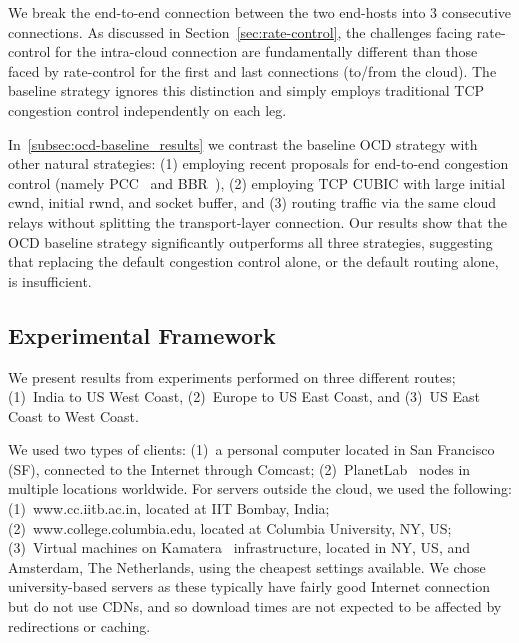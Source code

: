 \documentclass[newfonts=false,format=sigconf,10pt,letterpaper]{acmart}
\begin{document}
\vspace{0.1in} We break the end-to-end connection between the two end-hosts into $3$ consecutive connections. As discussed in Section~\ref{sec:rate-control}, the challenges facing rate-control for the intra-cloud connection are fundamentally different than those faced by rate-control for the first and last connections (to/from the cloud). The baseline strategy ignores this distinction and simply employs traditional TCP congestion control independently on each leg.

\vspace{0.1in}\noindent
In~\ref{subsec:ocd-baseline_results} we contrast the baseline OCD strategy with other natural strategies: (1)  employing recent proposals for end-to-end congestion control (namely PCC~\cite{PCC} and BBR~\cite{BBR}), (2) employing TCP CUBIC with large initial cwnd, initial rwnd, and socket buffer,
and (3) routing traffic via the same cloud relays without splitting the transport-layer connection. Our results show that the OCD baseline strategy significantly outperforms all three strategies, suggesting that replacing the default congestion control alone, or the default routing alone, is insufficient.

\subsection{Experimental Framework}

\vspace{0.1in} 
We present results from experiments performed on three different routes; (1)~India to US West Coast, (2)~Europe to US East Coast, and (3)~US East Coast to West Coast.

\vspace{0.1in} We used two types of clients: (1)~a personal computer located in San Francisco (SF), connected to the Internet through Comcast; (2)~PlanetLab~\cite{PlanetLab} nodes in multiple locations worldwide.
For servers outside the cloud, we used the following:
(1)~www.cc.iitb.ac.in, located at IIT Bombay, India; (2)~www.college.columbia.edu, located at Columbia University, NY, US;
(3)~Virtual machines on Kamatera~\cite{kamatera} infrastructure, located in NY, US, and Amsterdam, The Netherlands, using the cheapest settings available. 
We chose university-based servers as these typically have fairly good Internet connection but do not use CDNs, and so download times are not expected to be affected by redirections or caching. 
\end{document}
